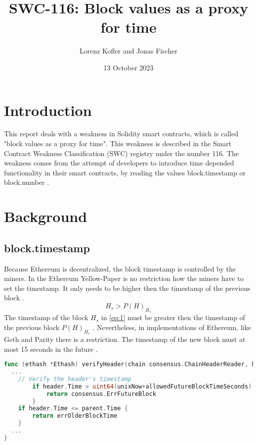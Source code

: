 \documentclass{article}
\title{SWC-116: Block values as a proxy for time}
\author{Lorenz Kofler and Jonas Fischer}
\date{13 October 2023}
\begin{document}
\maketitle
\tableofcontents
\newpage

\section{Introduction}
This report deals with a weakness in Solidity smart contracts, which is called
"block values as a proxy for time". This weakness is described in the Smart
Contract Weakness Classification (SWC) registry under the number 116. \newline
The weakness comes from the attempt of developers to introduce time depended
functionality in their smart contracts, by reading the values block.timestamp
or block.number \cite{swc116}. \newline

\section{Background}
\subsection{block.timestamp}

Because Ethereum is decentralized, the block timestamp is controlled by the
miners. In the Ethereum Yellow-Paper is no restriction how the miners have to set the timestamp. It
only needs to be higher then the timestamp of the previous block \cite{Conkas2021}.
\begin{equation} \label{eq:2}
H_s > P(H)_{H_s}
\end{equation}
The timestamp of the block $H_s$ in \ref{eq:1} must be greater then the timestamp of the previous block $P(H)_{H_s}$ \cite{ethyellowpaper2023}.
Nevertheless, in implementations of Ethereum, like Geth and Parity there is a restriction. The timestamp of the new block
must at most 15 seconds in the future \cite{Conkas2021}. \newline

\begin{lstlisting}[language=go, caption="The restriction for the timestamp in Geth. Source: consensus/ethash/consensus.go \cite{timestamp_code}"]
func (ethash *Ethash) verifyHeader(chain consensus.ChainHeaderReader, header, parent *types.Header, uncle bool, unixNow int64) error {
  ...
	// Verify the header's timestamp
		if header.Time > uint64(unixNow+allowedFutureBlockTimeSeconds) {
			return consensus.ErrFutureBlock
		}
	if header.Time <= parent.Time {
		return errOlderBlockTime
	}
  ...
}
\end{lstlisting}
\end{document}
